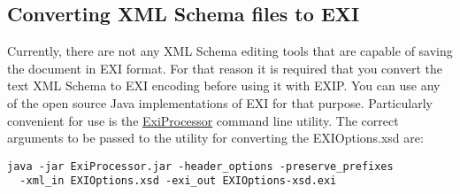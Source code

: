 \subsection{Converting XML Schema files to EXI}
Currently, there are not any XML Schema editing tools that are capable of saving the document in EXI format.
For that reason it is required that you convert the text XML Schema to EXI encoding before using it
with EXIP. You can use any of the open source Java implementations of EXI for that purpose. Particularly
convenient for use is the \href{http://sourceforge.net/projects/exiprocessor/files/}{ExiProcessor} command line utility.
The correct arguments to be passed to the utility for converting the EXIOptions.xsd are:
\begin{lstlisting}
java -jar ExiProcessor.jar -header_options -preserve_prefixes
  -xml_in EXIOptions.xsd -exi_out EXIOptions-xsd.exi
\end{lstlisting}